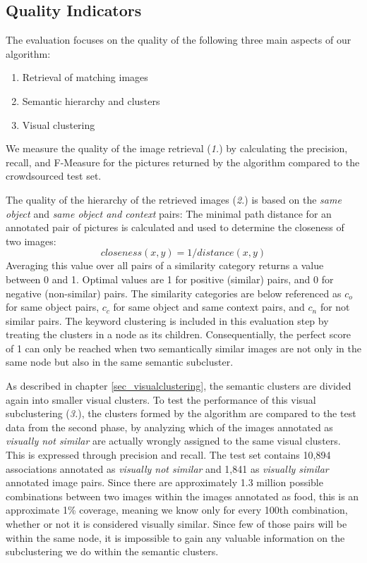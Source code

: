 \subsection{Quality Indicators}
\label{sec_qualityindicators}
The evaluation focuses on the quality of the following three main aspects of our algorithm:
\begin{enumerate}
\item Retrieval of matching images
\item Semantic hierarchy and clusters
\item Visual clustering
\end{enumerate}

We measure the quality of the image retrieval (\emph{1.}) by calculating the precision, recall, and F-Measure for the  pictures returned by the algorithm compared to the crowdsourced test set.

The quality of the hierarchy of the retrieved images (\emph{2.}) is based on the \emph{same object} and \emph{same object and context} pairs: The  minimal path distance for an annotated pair of pictures is calculated and used to determine the closeness of two images: \[closeness(x,y) = 1/distance(x,y)\]
Averaging this value over all pairs of a similarity category returns a value between 0 and 1. Optimal values are 1 for positive (similar) pairs, and 0 for negative (non-similar) pairs. The similarity categories are below referenced as $c_o$ for same object pairs, $c_c$ for same object and same context pairs, and $c_n$ for not similar pairs.
The keyword clustering is included in this evaluation step by treating the clusters in a node as its children. Consequentially, the perfect score of 1 can only be reached when two semantically similar images are not only in the same node but also in the same semantic subcluster.

\bigskip
As described in chapter \ref{sec_visualclustering}, the semantic clusters are divided again into smaller visual clusters.
To test the performance of this visual subclustering (\emph{3.}), the clusters formed by the algorithm are compared to the test data from the second phase, by analyzing which of the images annotated as \emph{visually not similar} are actually wrongly assigned to the same visual clusters. This is expressed through precision and recall.
The test set contains 10,894 associations annotated as \emph{visually not similar} and 1,841 as \emph{visually similar} annotated image pairs.
Since there are approximately 1.3 million possible combinations between two images within the images annotated as food, this is an approximate 1\% coverage, meaning we know only for every 100th combination, whether or not it is considered visually similar.
Since few of those pairs will be within the same node, it is impossible to gain any valuable information on the subclustering we do within the semantic clusters.

